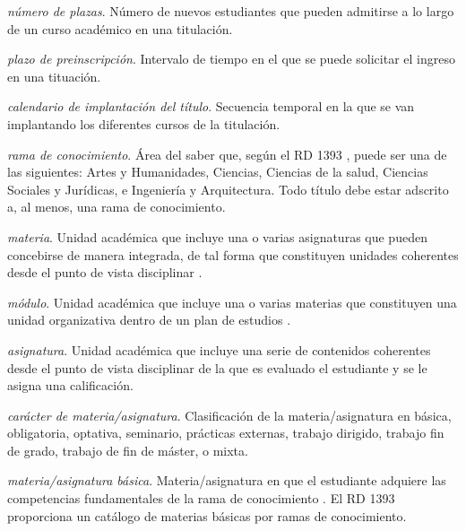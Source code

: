     \item \emph{número de plazas}. Número de nuevos estudiantes que pueden
        admitirse a lo largo de un curso académico en una titulación.

    \item \emph{plazo de preinscripción}. Intervalo de tiempo en el que se
        puede solicitar el ingreso en una tituación.

    \item \emph{calendario de implantación del título}. Secuencia temporal en la
        que se van implantando los diferentes cursos de la
        titulación\cite[página 62]{guiaAneca}.

    \item \emph{rama de conocimiento}. Área del saber que, según el RD 1393
        \cite[artículo 12, apartado 4]{rd1393}, puede ser una de las siguientes:
        Artes y Humanidades, Ciencias, Ciencias de la salud, Ciencias Sociales
        y Jurídicas, e Ingeniería y Arquitectura. Todo título debe estar
        adscrito a, al menos, una rama de conocimiento.

    \item \emph{materia}. Unidad académica que incluye una o varias asignaturas que
        pueden concebirse de manera integrada, de tal forma que constituyen
        unidades coherentes desde el punto de vista disciplinar \cite[página
        33]{guiaAneca}.

    \item \emph{módulo}. Unidad académica que incluye una o varias materias que
        constituyen una unidad organizativa dentro de un plan de estudios
        \cite[página 33]{guiaAneca}.

    \item \emph{asignatura}. Unidad académica que incluye una serie de
        contenidos coherentes desde el punto de vista disciplinar de la que es
        evaluado el estudiante y se le asigna una calificación.

    \item \emph{carácter de materia/asignatura}. Clasificación de la materia/asignatura en
        básica, obligatoria, optativa, seminario, prácticas externas,
        trabajo dirigido, trabajo fin de grado, trabajo de fin de máster, o
        mixta.\cite[artículo 12, apartado 2]{rd1393} \cite[sección
        D.5]{guiaMadridMasD}

    \item \emph{materia/asignatura básica}. Materia/asignatura en que el estudiante adquiere las
        competencias fundamentales de la rama de conocimiento \cite[artículo
        12, apartado 2]{rd1393}. El RD 1393 \cite[anexo II]{rd1393} proporciona
        un catálogo de materias básicas por ramas de conocimiento.

